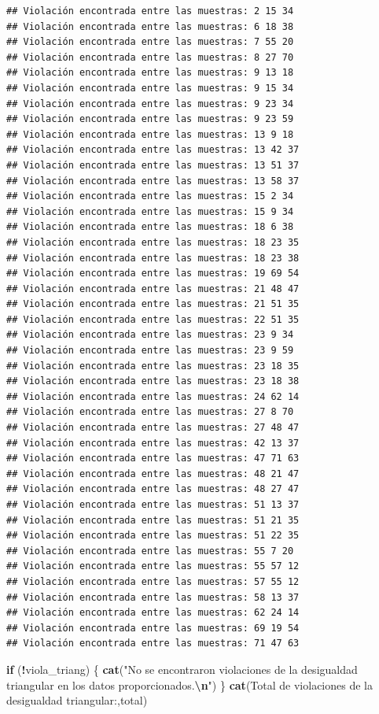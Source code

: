 \documentclass[
]{article}
\newenvironment{Shaded}{\begin{snugshade}}{\end{snugshade}}
\newcommand{\ControlFlowTok}[1]{\textcolor[rgb]{0.13,0.29,0.53}{\textbf{#1}}}
\newcommand{\FunctionTok}[1]{\textcolor[rgb]{0.13,0.29,0.53}{\textbf{#1}}}
\newcommand{\NormalTok}[1]{#1}
\newcommand{\SpecialCharTok}[1]{\textcolor[rgb]{0.81,0.36,0.00}{\textbf{#1}}}
\newcommand{\StringTok}[1]{\textcolor[rgb]{0.31,0.60,0.02}{#1}}
\begin{document}
\begin{verbatim}
## Violación encontrada entre las muestras: 2 15 34 
## Violación encontrada entre las muestras: 6 18 38 
## Violación encontrada entre las muestras: 7 55 20 
## Violación encontrada entre las muestras: 8 27 70 
## Violación encontrada entre las muestras: 9 13 18 
## Violación encontrada entre las muestras: 9 15 34 
## Violación encontrada entre las muestras: 9 23 34 
## Violación encontrada entre las muestras: 9 23 59 
## Violación encontrada entre las muestras: 13 9 18 
## Violación encontrada entre las muestras: 13 42 37 
## Violación encontrada entre las muestras: 13 51 37 
## Violación encontrada entre las muestras: 13 58 37 
## Violación encontrada entre las muestras: 15 2 34 
## Violación encontrada entre las muestras: 15 9 34 
## Violación encontrada entre las muestras: 18 6 38 
## Violación encontrada entre las muestras: 18 23 35 
## Violación encontrada entre las muestras: 18 23 38 
## Violación encontrada entre las muestras: 19 69 54 
## Violación encontrada entre las muestras: 21 48 47 
## Violación encontrada entre las muestras: 21 51 35 
## Violación encontrada entre las muestras: 22 51 35 
## Violación encontrada entre las muestras: 23 9 34 
## Violación encontrada entre las muestras: 23 9 59 
## Violación encontrada entre las muestras: 23 18 35 
## Violación encontrada entre las muestras: 23 18 38 
## Violación encontrada entre las muestras: 24 62 14 
## Violación encontrada entre las muestras: 27 8 70 
## Violación encontrada entre las muestras: 27 48 47 
## Violación encontrada entre las muestras: 42 13 37 
## Violación encontrada entre las muestras: 47 71 63 
## Violación encontrada entre las muestras: 48 21 47 
## Violación encontrada entre las muestras: 48 27 47 
## Violación encontrada entre las muestras: 51 13 37 
## Violación encontrada entre las muestras: 51 21 35 
## Violación encontrada entre las muestras: 51 22 35 
## Violación encontrada entre las muestras: 55 7 20 
## Violación encontrada entre las muestras: 55 57 12 
## Violación encontrada entre las muestras: 57 55 12 
## Violación encontrada entre las muestras: 58 13 37 
## Violación encontrada entre las muestras: 62 24 14 
## Violación encontrada entre las muestras: 69 19 54 
## Violación encontrada entre las muestras: 71 47 63
\end{verbatim}

\begin{Shaded}
\begin{Highlighting}[]
\ControlFlowTok{if}\NormalTok{ (}\SpecialCharTok{!}\NormalTok{viola\_triang) \{}
  \FunctionTok{cat}\NormalTok{(}\StringTok{"No se encontraron violaciones de la desigualdad triangular en los datos proporcionados.}\SpecialCharTok{\textbackslash{}n}\StringTok{"}\NormalTok{)}
\NormalTok{\}}
\FunctionTok{cat}\NormalTok{(}\StringTok{\textquotesingle{}Total de violaciones de la desigualdad triangular:\textquotesingle{}}\NormalTok{,total)}
\end{Highlighting}
\end{Shaded}
\end{document}

